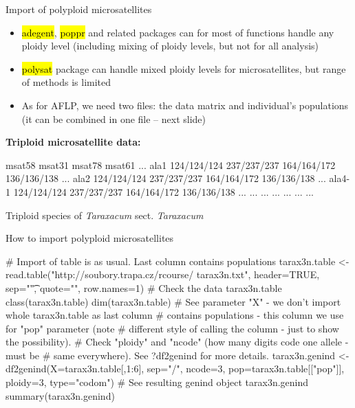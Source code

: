 \documentclass[compress, ucs, xelatex, 11pt, xcolor=svgnames,
  hyperref={
    bookmarks=true,
    unicode=true,
    colorlinks=true,
    pdftitle={Molecular data in R},
    plainpages=false,
    pdfauthor={Vojtech Zeisek},
    pdfsubject={Course about phylogeny and evolution in R},
    pdfcreator={XeLaTeX},
    pdfkeywords={R, evolution, phylogeny, molecular data},
    linkcolor=Tomato,
    anchorcolor=SaddleBrown,
    citecolor=Goldenrod,
    filecolor=DarkMagenta,
    menucolor=Sienna,
    urlcolor=DarkTurquoise,
    pdftex},
  url={hyphens, lowtilde} %
  ]{beamer}
\renewcommand{\texttt}[1]{\hl{\ttfamily #1}}
\begin{document}
\begin{frame}[fragile]{Import of polyploid microsatellites}
  \vfill
  \begin{itemize}
    \item \texttt{adegent}, \texttt{poppr} and related packages can for most of functions handle any ploidy level (including mixing of ploidy levels, but not for all analysis)
    \item \texttt{polysat} package can handle mixed ploidy levels for microsatellites, but range of methods is limited
    \item As for AFLP, we need two files: the data matrix and individual's populations (it can be combined in one file -- next slide)
  \end{itemize}
  \vfill
  \textbf{Triploid microsatellite data:}
  \vfil
  \begin{spluscode}
           msat58      msat31      msat78      msat61      ...
    ala1   124/124/124 237/237/237 164/164/172 136/136/138 ...
    ala2   124/124/124 237/237/237 164/164/172 136/136/138 ...
    ala4-1 124/124/124 237/237/237 164/164/172 136/136/138 ...
    ...    ...         ...         ...         ...         ...
  \end{spluscode}
  \vfil
  \begin{footnotesize}
    Triploid species of \textit{Taraxacum} sect. \textit{Taraxacum}
  \end{footnotesize}
  \vfill
\end{frame}

\begin{frame}[fragile]{How to import polyploid microsatellites}
  \begin{spluscode}
    # Import of table is as usual. Last column contains populations
    tarax3n.table <- read.table("http://soubory.trapa.cz/rcourse/
      tarax3n.txt", header=TRUE, sep="\t", quote="", row.names=1)
    # Check the data
    tarax3n.table
    class(tarax3n.table)
    dim(tarax3n.table)
    # See parameter "X" - we don't import whole tarax3n.table as last column
    # contains populations - this column we use for "pop" parameter (note
    # different style of calling the column - just to show the possibility).
    # Check "ploidy" and "ncode" (how many digits code one allele - must be
    # same everywhere). See ?df2genind for more details.
    tarax3n.genind <- df2genind(X=tarax3n.table[,1:6], sep="/", ncode=3,
      pop=tarax3n.table[["pop"]], ploidy=3, type="codom")
    # See resulting genind object
    tarax3n.genind
    summary(tarax3n.genind)
  \end{spluscode}
\end{frame}
\end{document}
